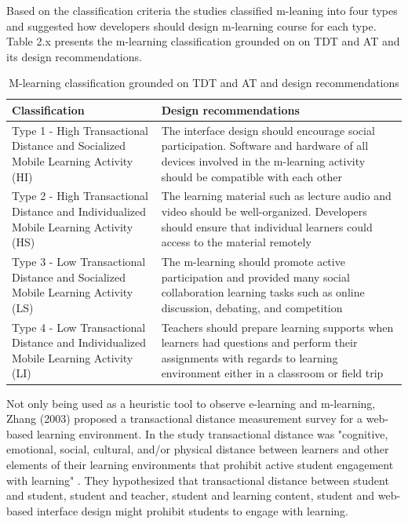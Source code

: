 Based on the classification criteria the studies classified m-leaning into four types and suggested how developers should design m-learning course for each type. Table 2.x presents the m-learning classification grounded on on TDT and AT and its design recommendations. 
\begin{table}[!htb]
\centering
\caption{M-learning classification grounded on TDT and AT and design recommendations \cite{park2011pedagogical}}
\begin{tabular}{ |p{4.5cm}|p{8.5cm}|} 
 \hline
Classification & Design recommendations\\
\hline
Type 1 - High Transactional Distance and Socialized Mobile Learning Activity (HI) & The interface design should encourage social participation. Software and hardware of all devices involved in the m-learning activity should be compatible with each other\\
\hline 
Type 2 - High Transactional Distance and Individualized Mobile Learning Activity (HS) & The learning material such as lecture audio and video should be well-organized. Developers should ensure that individual learners could access to the material remotely\\
\hline Type 3 - Low Transactional Distance and Socialized Mobile Learning Activity (LS) & The m-learning should promote active participation and provided many social collaboration learning tasks such as online discussion, debating, and competition \\
\hline Type 4 - Low Transactional Distance and Individualized Mobile Learning Activity (LI) & Teachers should prepare learning supports when learners had questions and perform their assignments with regards to learning environment either in a classroom or field trip\\
\hline
\end{tabular}
\end{table}

Not only being used as a heuristic tool to observe e-learning and m-learning, Zhang (2003) \cite{zhang2003transactional} proposed a transactional distance measurement survey for a web-based learning environment. In the study transactional distance was "cognitive, emotional, social, cultural, and/or physical distance between learners and other elements of their learning environments that prohibit active student engagement with learning" \cite[pp.148]{zhang2003transactional}. They \cite{zhang2003transactional} hypothesized that transactional distance between student and student, student and teacher, student and learning content, student and web-based interface design might prohibit students to engage with learning. 

